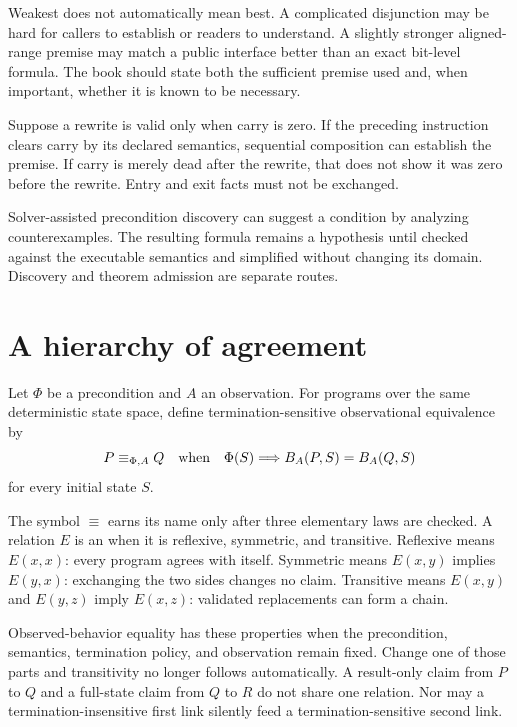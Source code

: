Weakest does not automatically mean best. A complicated disjunction may be
hard for callers to establish or readers to understand. A slightly stronger
aligned-range premise may match a public interface better than an exact
bit-level formula. The book should state both the sufficient premise used and,
when important, whether it is known to be necessary.

\begin{example}[title={A caller must discharge the premise}]
Suppose a rewrite is valid only when carry is zero. If the preceding
instruction clears carry by its declared semantics, sequential composition can
establish the premise. If carry is merely dead after the rewrite, that does not
show it was zero before the rewrite. Entry and exit facts must not be exchanged.
\end{example}

Solver-assisted precondition discovery can suggest a condition by analyzing
counterexamples. The resulting formula remains a hypothesis until checked
against the executable semantics and simplified without changing its domain.
Discovery and theorem admission are separate routes.

\section{A hierarchy of agreement}

Let \(\Phi\) be a precondition and \(A\) an observation. For programs over the
same deterministic state space, define termination-sensitive observational
equivalence by
\[
 P\equiv_{\Phi,A}Q
 \quad\hbox{when}\quad
 \Phi(S)\Longrightarrow B_A(P,S)=B_A(Q,S)
\]
for every initial state \(S\).

The symbol \(\equiv\) earns its name only after three elementary laws are
checked. A relation \(E\) is an  when it is
reflexive, symmetric, and transitive. Reflexive means \(E(x,x)\): every program
agrees with itself. Symmetric means \(E(x,y)\) implies \(E(y,x)\): exchanging
the two sides changes no claim. Transitive means \(E(x,y)\) and \(E(y,z)\)
imply \(E(x,z)\): validated replacements can form a chain.

Observed-behavior equality has these properties when the precondition,
semantics, termination policy, and observation remain fixed. Change one of
those parts and transitivity no longer follows automatically. A result-only
claim from \(P\) to \(Q\) and a full-state claim from \(Q\) to \(R\) do not
share one relation. Nor may a termination-insensitive first link silently feed
a termination-sensitive second link.

